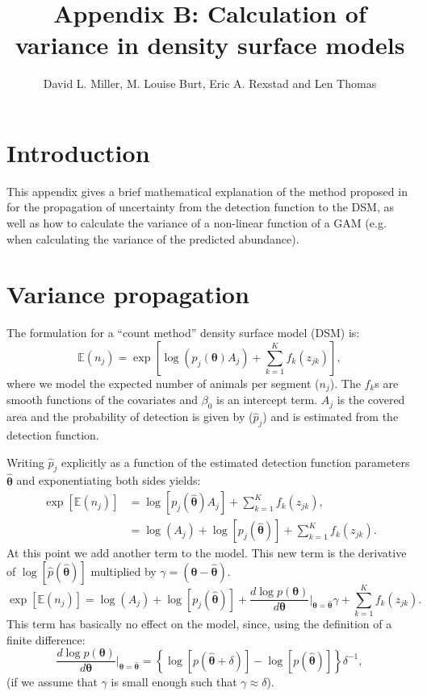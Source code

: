 \documentclass[11pt]{amsart}
\title{Appendix B: Calculation of variance in density surface models}
\author{David L. Miller, M. Louise Burt, Eric A. Rexstad and Len Thomas}
\begin{document}
\maketitle


\section{Introduction}

This appendix gives a brief mathematical explanation of the method proposed in \cite{WILLIAMS:2011in} for the propagation of uncertainty from the detection function to the DSM, as well as how to calculate the variance of a non-linear function of a GAM (e.g. when calculating the variance of the predicted abundance).

\section{Variance propagation}

The formulation for a ``count method'' density surface model (DSM) is:
\begin{equation*}
\mathbb{E}(n_j) = \exp\left[ \log\left(p_j(\bm{\theta})A_j\right) + \sum_{k=1}^K f_k(z_{jk}) \right],
\end{equation*}
where we model the expected number of animals per segment ($n_j$). The $f_k$s are smooth functions of the covariates and $\beta_0$ is an intercept term. $A_j$ is the covered area and the probability of detection is given by ($\hat{p}_j$) and is estimated from the detection function.

Writing $\hat{p}_j$ explicitly as a function of the estimated detection function parameters $\bm{\hat{\theta}}$ and exponentiating both sides yields:
\begin{align*}
\exp\left[ \mathbb{E}(n_j) \right] &= \log\left[p_j(\bm{\hat{\theta}})A_j\right] + \sum_{k=1}^K f_k(z_{jk}), \\
&= \log\left(A_j\right) + \log\left[p_j(\bm{\hat{\theta}})\right] + \sum_{k=1}^K f_k(z_{jk}).
\end{align*}
At this point we add another term to the model. This new term is the derivative of $\log\left[ \hat{p}(\bm{\hat{\theta}})\right]$ multiplied by $\gamma =(\bm{\theta} - \bm{\hat{\theta}})$.
\begin{equation}
\exp\left[ \mathbb{E}(n_j) \right] = \log\left(A_j\right) + \log\left[p_j(\bm{\hat{\theta}})\right] + \frac{ d \log p(\bm{\theta})}{d\bm{\theta}} \Big\vert_{\bm{\theta} = \hat{\bm{\theta}}} \gamma + \sum_{k=1}^K f_k(z_{jk}).
\label{extra-term}
\end{equation}
This term has basically no effect on the model, since, using the definition of a finite difference:
\begin{equation*}
\frac{ d \log p(\bm{\theta})}{d\bm{\theta}} \Big\vert_{\bm{\theta} = \hat{\bm{\theta}}} = \left\{\log\left[p(\hat{\bm{\theta}} + \delta)\right] - \log\left[p(\hat{\bm{\theta}})\right]\right\}\delta^{-1},
\end{equation*}
(if we assume that $\gamma$ is small enough such that $\gamma \approx \delta$).
\end{document}
